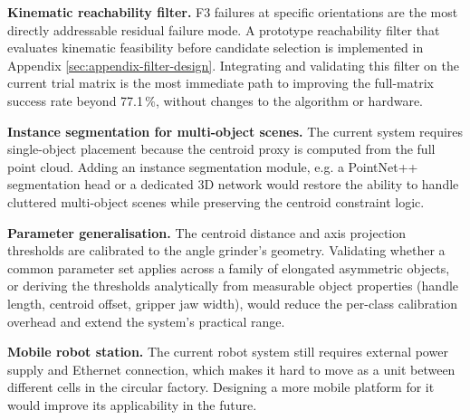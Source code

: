 \documentclass[oneside,studentpaper]{wbk}
\begin{document}

\textbf{Kinematic reachability filter.} F3 failures at specific orientations are the most directly addressable residual failure mode. A prototype reachability filter that evaluates kinematic feasibility before candidate selection is implemented in Appendix \cref{sec:appendix-filter-design}. Integrating and validating this filter on the current trial matrix is the most immediate path to improving the full-matrix success rate beyond 77.1\,\%, without changes to the algorithm or hardware.

\textbf{Instance segmentation for multi-object scenes.} The current system requires single-object placement because the centroid proxy is computed from the full point cloud. Adding an instance segmentation module, e.g. a PointNet++~\cite{qi2017pointnet2} segmentation head or a dedicated 3D network would restore the ability to handle cluttered multi-object scenes while preserving the centroid constraint logic. 

\textbf{Parameter generalisation.} The centroid distance and axis projection thresholds are calibrated to the angle grinder's geometry. Validating whether a common parameter set applies across a family of elongated asymmetric objects, or deriving the thresholds analytically from measurable object properties (handle length, centroid offset, gripper jaw width), would reduce the per-class calibration overhead and extend the system's practical range.

\textbf{Mobile robot station.} The current robot system still requires external power supply and Ethernet connection, which makes it hard to move as a unit between different cells in the circular factory. Designing a more mobile platform for it would improve its applicability in the future.


\end{document}
